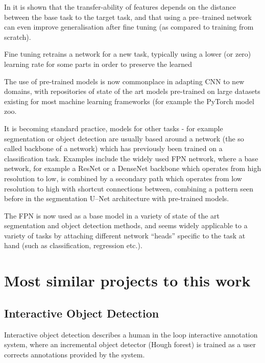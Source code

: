 In \cite{Yosinski} it is shown that the transfer-ability of features depends on the distance between the base task to the target task, and that using a pre--trained network can even improve generalisation after fine tuning (as compared to training from scratch).

Fine tuning retrains a network for a new task, typically using a lower (or zero) learning rate for some parts in order to preserve the learned 

The use of pre-trained models is now commonplace in adapting \gls{CNN} to new domains, with repositories of state of the art models pre-trained on large datasets existing for most machine learning frameworks (for example the PyTorch \cite{Paszke2017} model zoo. 

It is becoming standard practice, models for other tasks - for example segmentation or object detection are usually based around a network (the so called backbone of a network) which has previously been trained on a classification task. Examples include the widely used \gls{FPN} network, \cite{Lin2017a} where a base network, for example a ResNet \cite{He} or a DenseNet \cite{Huang2016} backbone which operates from high resolution to low, is combined by a secondary path which operates from low resolution to high with shortcut connections between, combining a pattern seen before in the segmentation U--Net \cite{Ronneberger2015} architecture with pre-trained models.

The \gls{FPN} is now used as a base model in a variety of state of the art segmentation and object detection methods, and seems widely applicable to a variety of tasks by attaching different network ``heads'' specific to the task at hand (such as classification, regression etc.).




\section {Most similar projects to this work}
\label{sec:closest}

\subsection {Interactive Object Detection \cite{Yao2012}}
Interactive object detection \cite{Yao2012} describes a human in the loop interactive annotation system, where an incremental object detector (Hough forest) is trained as a user corrects annotations provided by the system. 


